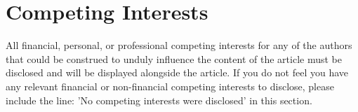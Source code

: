 \section*{Competing Interests}
All financial, personal, or professional competing interests for any of the authors that could be construed to unduly influence the content of the article must be disclosed and will be displayed alongside the article.
If you do not feel you have any relevant financial or non-financial competing interests to disclose, please include the line: 'No competing interests were disclosed' in this section.
